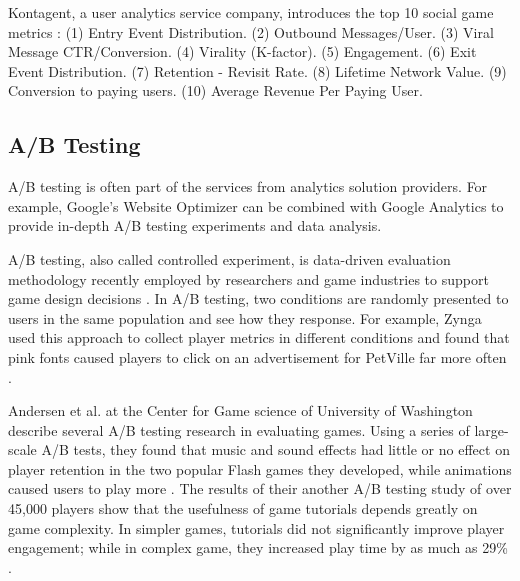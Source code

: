 Kontagent, a user analytics service company, introduces the top 10 social game metrics \cite {Kontagent2010}: (1) Entry Event Distribution. (2) Outbound Messages/User. (3) Viral Message CTR/Conversion. (4) Virality (K-factor). (5) Engagement. (6) Exit Event Distribution. (7) Retention - Revisit Rate. (8) Lifetime Network Value. (9) Conversion to paying users. (10) Average Revenue Per Paying User.

\subsection{A/B Testing}
A/B testing is often part of the services from analytics solution providers. For example, Google's Website Optimizer \cite{googleoptimizer} can be combined with Google Analytics to provide in-depth A/B testing experiments and data analysis.  

A/B testing, also called controlled experiment, is data-driven evaluation methodology recently employed by researchers and game industries to support game design decisions \cite{kohavi2007practical}. In A/B testing, two conditions are randomly presented to users in the same population and see how they response. For example, Zynga used this approach to collect player metrics in different conditions and found that pink fonts caused players to click on an advertisement for PetVille far more often \cite {zyngaTesting}.

Andersen et al. at the Center for Game science of University of Washington describe several A/B testing research in evaluating games. Using a series of large-scale A/B tests, they found that music and sound effects had little or no effect on player retention in the two popular Flash games they developed, while animations caused users to play more \cite{andersen2011placing}. The results of their another A/B testing study of over 45,000 players show that the usefulness of game tutorials depends greatly on game complexity. In simpler games, tutorials did not significantly improve player engagement; while in complex game, they increased play time by as much as 29\% \cite{andersen2012impact}. 


